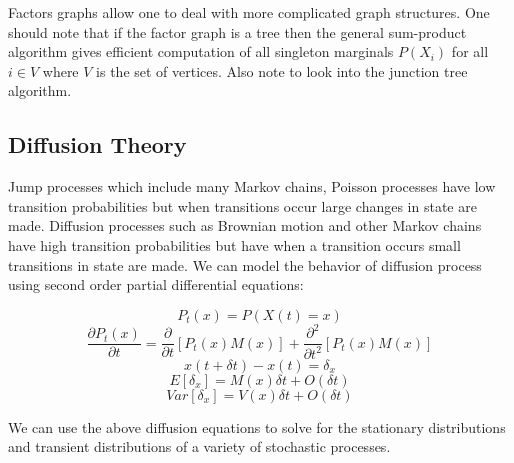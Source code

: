\documentclass[12pt]{report}
\begin{document}
\newpage

Factors graphs allow one to deal with more complicated graph structures. One should note that if the factor graph is a tree then the general sum-product algorithm gives efficient computation of all singleton marginals $P(X_i)$ for all $i \in V$ where $V$ is the set of vertices. Also note to look into the junction tree algorithm. 

\subsection*{Diffusion Theory}

Jump processes which include many Markov chains, Poisson processes have low transition probabilities but when transitions occur large changes in state are made. Diffusion processes such as Brownian motion and other Markov chains have high transition probabilities but have when a transition occurs small transitions in state are made. We can model the behavior of diffusion process using second order partial differential equations:

$$P_{t}(x) = P(X(t) = x)$$
$$\frac{\partial P_{t}(x)}{\partial t} = \frac{\partial}{\partial t} [P_{t}(x) M(x)] + \frac{\partial^2}{\partial t^2} [P_{t}(x)M(x)]$$
$$x(t + \delta t) - x(t) = \delta_x$$
$$E[\delta_x] = M(x) \delta t + O(\delta t)$$
$$Var[\delta_x] = V(x) \delta t + O(\delta t)$$

We can use the above diffusion equations to solve for the stationary distributions and transient distributions of a variety of stochastic processes.
\end{document}

